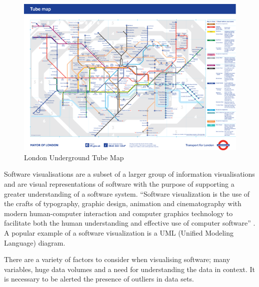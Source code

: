 \begin{figure}[h!]
  	 \centering
   	\includegraphics[width=140mm]{londontube.png}
  	\caption{London Underground Tube Map}
	\label{fig:londontube}
\end{figure}


Software visualisations are a subset of a larger group of information visualisations and are visual representations of software with the purpose of supporting a greater understanding of a software system. ``Software visualization is the use of the crafts of typography, graphic design, animation and cinematography with modern human-computer interaction and computer graphics technology to facilitate both the human understanding and effective use of computer software'' \citep{price93}. A popular example of a software visualization is a UML (Unified Modeling Language) diagram. %

There are a variety of factors to consider when visualising software; many variables, huge data volumes and a need for understanding the data in context. It is necessary to be alerted the presence of outliers in data sets. %


